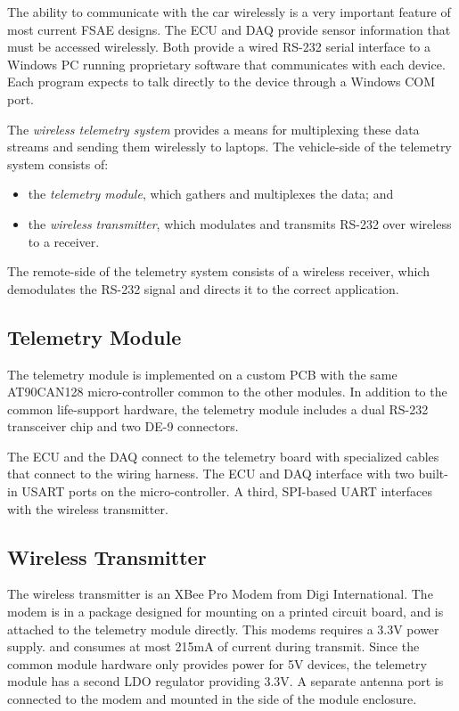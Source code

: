 The ability to communicate with the car wirelessly is a very important feature of most current FSAE designs. The ECU and DAQ provide sensor information that must be accessed wirelessly. Both provide a wired RS-232 serial interface to a Windows PC running proprietary software that communicates with each device. Each program expects to talk directly to the device through a Windows COM port.

The \emph{wireless telemetry system} provides a means for multiplexing these data streams and sending them wirelessly to laptops. The vehicle-side of the telemetry system consists of:

\begin{itemize}
\item the \emph{telemetry module}, which gathers and multiplexes the data; and
\item the \emph{wireless transmitter}, which modulates and transmits RS-232 over wireless to a receiver.
\end{itemize}

The remote-side of the telemetry system consists of a wireless receiver, which demodulates the RS-232 signal and directs it to the correct application.

\subsection{Telemetry Module}

The telemetry module is implemented on a custom PCB with the same AT90CAN128 micro-controller common to the other modules. In addition to the common life-support hardware, the telemetry module includes a dual RS-232 transceiver chip and two DE-9 connectors. 

The ECU and the DAQ connect to the telemetry board with specialized cables that connect to the wiring harness. The ECU and DAQ interface with two built-in USART ports on the micro-controller. A third, SPI-based UART interfaces with the wireless transmitter. 

\subsection{Wireless Transmitter}

The wireless transmitter is an XBee Pro Modem from Digi International. The modem is in a package designed for mounting on a printed circuit board, and is attached to the telemetry module directly. This modems requires a 3.3V power supply. and consumes at most 215mA of current during transmit. Since the common module hardware only provides power for 5V devices, the telemetry module has a second LDO regulator providing 3.3V. A separate antenna port is connected to the modem and mounted in the side of the module enclosure.


